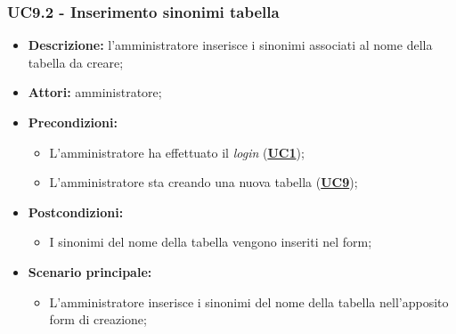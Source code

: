 \subsubsection{UC9.2 - Inserimento sinonimi tabella}
\label{sec:UC9.2}
\begin{itemize}
	\item \textbf{Descrizione:} l’amministratore inserisce i sinonimi associati al nome della tabella da creare;
	\item \textbf{Attori:} amministratore;
	\item \textbf{Precondizioni:} 
	\begin{itemize}
		\item L’amministratore ha effettuato il \textit{login} (\hyperref[sec:UC1]{\textbf{UC1}});
		\item L’amministratore sta creando una nuova tabella (\hyperref[sec:UC9]{\textbf{UC9}});
	\end{itemize}
	\item \textbf{Postcondizioni:} 
	\begin{itemize}
		\item I sinonimi del nome della tabella vengono inseriti nel form;
	\end{itemize}
	\item \textbf{Scenario principale:} 
	\begin{itemize}
		\item L’amministratore inserisce i sinonimi del nome della tabella nell'apposito form di creazione;
	\end{itemize}
\end{itemize}

